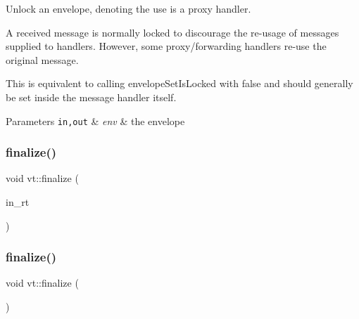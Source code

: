 Unlock an envelope, denoting the use is a proxy handler. 

A received message is normally locked to discourage the re-\/usage of messages supplied to handlers. However, some proxy/forwarding handlers re-\/use the original message.

This is equivalent to calling {\ttfamily envelope\+Set\+Is\+Locked} with false and should generally be set inside the message handler itself.


\begin{DoxyParams}[1]{Parameters}
\mbox{\tt in,out}  & {\em env} & the envelope \\
\hline
\end{DoxyParams}
\mbox{\label{namespacevt_a540d90dbd6e97b69f1dcbc9ee9314cff}} 
\subsubsection{\texorpdfstring{finalize()}{finalize()}\hspace{0.1cm}{\footnotesize\ttfamily [1/2]}}
{\footnotesize\ttfamily void vt\+::finalize (\begin{DoxyParamCaption}\item[{\hyperlink{namespacevt_a0ce60e0299d8fa32223b3b9ffa0af466}{Runtime\+Ptr\+Type}}]{in\+\_\+rt }\end{DoxyParamCaption})}

\mbox{\label{namespacevt_ae8e663109f635cbeca94c39b89b4683c}} 
\subsubsection{\texorpdfstring{finalize()}{finalize()}\hspace{0.1cm}{\footnotesize\ttfamily [2/2]}}
{\footnotesize\ttfamily void vt\+::finalize (\begin{DoxyParamCaption}{ }\end{DoxyParamCaption})}

\mbox{\label{namespacevt_a580ef23e9a224fc0907da1a6db308b5b}} 
